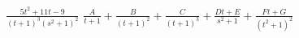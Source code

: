 {$\displaystyle \frac{5t^2+11t-9}{(t+1)^3(s^2+1)^2}$}
{$\displaystyle \frac{A}{t+1} + \frac{B}{(t+1)^2} + \frac{C}{(t+1)^3} + \frac{Dt+E}{s^2+1} + \frac{Ft+G}{(t^2+1)^2}$}

